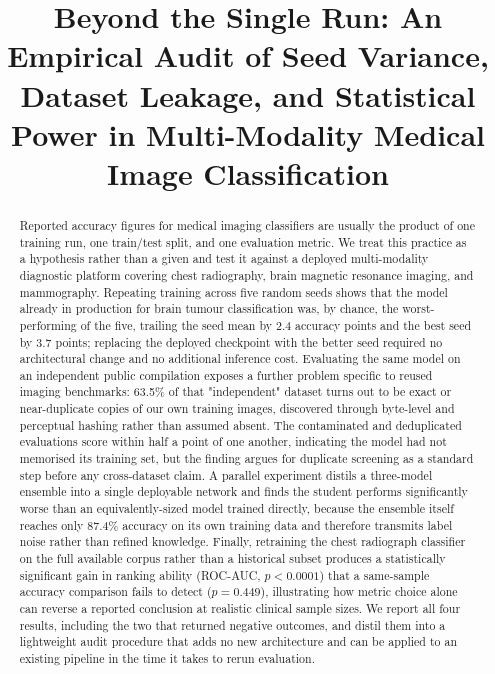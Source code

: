 \documentclass[conference]{IEEEtran}
\begin{document}
\title{Beyond the Single Run: An Empirical Audit of Seed Variance, Dataset Leakage, and Statistical Power in Multi-Modality Medical Image Classification}

\author{
}

\maketitle

\begin{abstract}
Reported accuracy figures for medical imaging classifiers are usually the product of one training run, one train/test split, and one evaluation metric. We treat this practice as a hypothesis rather than a given and test it against a deployed multi-modality diagnostic platform covering chest radiography, brain magnetic resonance imaging, and mammography. Repeating training across five random seeds shows that the model already in production for brain tumour classification was, by chance, the worst-performing of the five, trailing the seed mean by 2.4 accuracy points and the best seed by 3.7 points; replacing the deployed checkpoint with the better seed required no architectural change and no additional inference cost. Evaluating the same model on an independent public compilation exposes a further problem specific to reused imaging benchmarks: 63.5\% of that "independent" dataset turns out to be exact or near-duplicate copies of our own training images, discovered through byte-level and perceptual hashing rather than assumed absent. The contaminated and deduplicated evaluations score within half a point of one another, indicating the model had not memorised its training set, but the finding argues for duplicate screening as a standard step before any cross-dataset claim. A parallel experiment distils a three-model ensemble into a single deployable network and finds the student performs significantly worse than an equivalently-sized model trained directly, because the ensemble itself reaches only 87.4\% accuracy on its own training data and therefore transmits label noise rather than refined knowledge. Finally, retraining the chest radiograph classifier on the full available corpus rather than a historical subset produces a statistically significant gain in ranking ability (ROC-AUC, $p<0.0001$) that a same-sample accuracy comparison fails to detect ($p=0.449$), illustrating how metric choice alone can reverse a reported conclusion at realistic clinical sample sizes. We report all four results, including the two that returned negative outcomes, and distil them into a lightweight audit procedure that adds no new architecture and can be applied to an existing pipeline in the time it takes to rerun evaluation.
\end{abstract}
\end{document}
